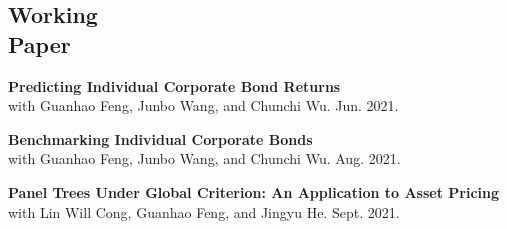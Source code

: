 \documentclass[margin]{res}
\begin{document}
\begin{resume}
\section{\sc Working \\ Paper}

\textbf{Predicting Individual Corporate Bond Returns \\}
with Guanhao Feng, Junbo Wang, and Chunchi Wu. Jun. 2021.

\textbf{Benchmarking Individual Corporate Bonds \\}
with Guanhao Feng, Junbo Wang, and Chunchi Wu.  Aug. 2021.

\textbf{Panel Trees Under Global Criterion: An Application to Asset Pricing \\}
with Lin Will Cong, Guanhao Feng, and Jingyu He. Sept. 2021.









\end{resume}
\end{document}
